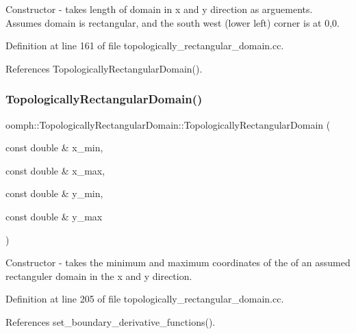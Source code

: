 Constructor -\/ takes length of domain in x and y direction as arguements. Assumes domain is rectangular, and the south west (lower left) corner is at 0,0. 



Definition at line 161 of file topologically\+\_\+rectangular\+\_\+domain.\+cc.



References Topologically\+Rectangular\+Domain().

\mbox{\label{classoomph_1_1TopologicallyRectangularDomain_a6b00e4df8a228538f9beac85e2927033}} 
\subsubsection{\texorpdfstring{Topologically\+Rectangular\+Domain()}{TopologicallyRectangularDomain()}\hspace{0.1cm}{\footnotesize\ttfamily [3/4]}}
{\footnotesize\ttfamily oomph\+::\+Topologically\+Rectangular\+Domain\+::\+Topologically\+Rectangular\+Domain (\begin{DoxyParamCaption}\item[{const double \&}]{x\+\_\+min,  }\item[{const double \&}]{x\+\_\+max,  }\item[{const double \&}]{y\+\_\+min,  }\item[{const double \&}]{y\+\_\+max }\end{DoxyParamCaption})}



Constructor -\/ takes the minimum and maximum coordinates of the of an assumed rectanguler domain in the x and y direction. 



Definition at line 205 of file topologically\+\_\+rectangular\+\_\+domain.\+cc.



References set\+\_\+boundary\+\_\+derivative\+\_\+functions().

\mbox{\label{classoomph_1_1TopologicallyRectangularDomain_a31181fa9d4032d7a1f3aa93fa011b85c}} 
